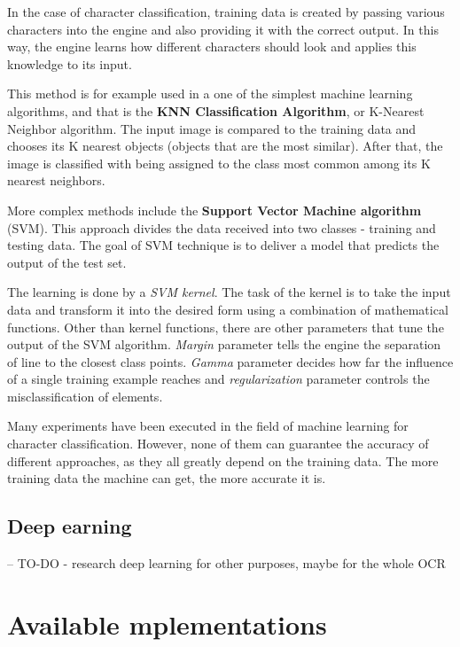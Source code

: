 In the case of character classification, training data is created by passing various characters into the engine and also providing it with the correct output. In this way, the engine learns how different characters should look and applies this knowledge to its input.

This method is for example used in a one of the simplest machine learning algorithms, and that is the \textbf{KNN Classification Algorithm}, or K-Nearest Neighbor algorithm. The input image is compared to the training data and chooses its K nearest objects (objects that are the most similar). After that, the image is classified with being assigned to the class most common among its K nearest neighbors.

More complex methods include the \textbf{Support Vector Machine algorithm} (SVM). This approach divides the data received into two classes - training and testing data. The goal of SVM technique is to deliver a model that predicts the output of the test set.

The learning is done by a \emph{SVM kernel}. The task of the kernel is to take the input data and transform it into the desired form using a combination of mathematical functions. Other than kernel functions, there are other parameters that tune the output of the SVM algorithm. \emph{Margin} parameter tells the engine the separation of line to the closest class points. \emph{Gamma} parameter decides how far the influence of a single training example reaches and \emph{regularization} parameter controls the misclassification of elements.

Many experiments have been executed in the field of machine learning for character classification. However, none of them can guarantee the accuracy of different approaches, as they all greatly depend on the training data. The more training data the machine can get, the more accurate it is. 

\subsection{Deep earning}
-- TO-DO - research deep learning for other purposes, maybe for the whole OCR


\section{Available mplementations}

